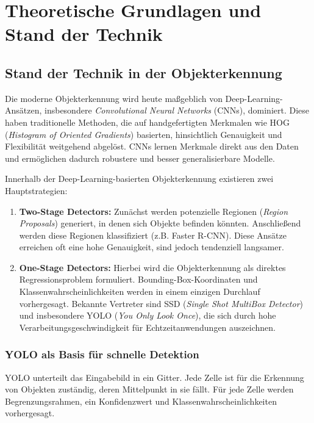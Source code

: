 

\section{Theoretische Grundlagen und Stand der Technik}

\subsection{Stand der Technik in der Objekterkennung}

Die moderne Objekterkennung wird heute maßgeblich von Deep-Learning-Ansätzen, insbesondere \textit{Convolutional Neural Networks} (CNNs), dominiert. Diese haben traditionelle Methoden, die auf handgefertigten Merkmalen wie HOG (\textit{Histogram of Oriented Gradients}) basierten, hinsichtlich Genauigkeit und Flexibilität weitgehend abgelöst. CNNs lernen Merkmale direkt aus den Daten und ermöglichen dadurch robustere und besser generalisierbare Modelle.

Innerhalb der Deep-Learning-basierten Objekterkennung existieren zwei Hauptstrategien:

\begin{enumerate}
    \item \textbf{Two-Stage Detectors:} Zunächst werden potenzielle Regionen (\textit{Region Proposals}) generiert, in denen sich Objekte befinden könnten. Anschließend werden diese Regionen klassifiziert (z.B. Faster R-CNN). Diese Ansätze erreichen oft eine hohe Genauigkeit, sind jedoch tendenziell langsamer.
    \item \textbf{One-Stage Detectors:} Hierbei wird die Objekterkennung als direktes Regressionsproblem formuliert. Bounding-Box-Koordinaten und Klassenwahrscheinlichkeiten werden in einem einzigen Durchlauf vorhergesagt. Bekannte Vertreter sind SSD (\textit{Single Shot MultiBox Detector}) und insbesondere YOLO (\textit{You Only Look Once}), die sich durch hohe Verarbeitungsgeschwindigkeit für Echtzeitanwendungen auszeichnen.
\end{enumerate}

\subsubsection{YOLO als Basis für schnelle Detektion}

YOLO unterteilt das Eingabebild in ein Gitter. Jede Zelle ist für die Erkennung von Objekten zuständig, deren Mittelpunkt in sie fällt. Für jede Zelle werden Begrenzungsrahmen, ein Konfidenzwert und Klassenwahrscheinlichkeiten vorhergesagt. 

